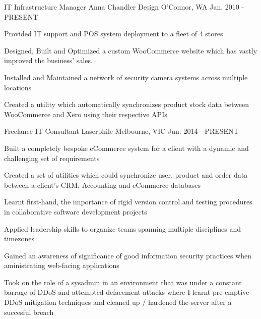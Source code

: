 

\begin{cventries}

  \cventry
    {IT Infrastructure Manager} %
    {Anna Chandler Design} %
    {O'Connor, WA} %
    {Jan. 2010 - PRESENT} %
    {
      \begin{cvitems} %
        \item {Provided IT support and POS system deployment to a fleet of 4 stores}
        \item {Designed, Built and Optimized a custom WooCommerce website which has vastly improved the business’ sales.}
        \item {Installed and Maintained a network of security camera systems across multiple locations}
        \item {Created a utility which automatically synchronizes product stock data between WooCommerce and Xero using their respective APIs}
      \end{cvitems}
    }

  \cventry
    {Freelance IT Consultant} %
    {Laserphile} %
    {Melbourne, VIC} %
    {Jun. 2014 - PRESENT} %
    {
      \begin{cvitems} %
        \item {Built a completely bespoke eCommerce system for a client with a dynamic and challenging set of requirements}
        \item {Created a set of utilities which could synchronize user, product and order data between a client's CRM, Accounting and eCommerce databases}
        \item {Learnt first-hand, the importance of rigid version control and testing procedures in collaborative software development projects}
        \item {Applied leadership skills to organize teams spanning multiple disciplines and timezones}
        \item {Gained an awareness of significance of good information security practices when aministrating web-facing applications}
        \item {Took on the role of a sysadmin in an environment that was under a constant barrage of DDoS and attempted defacement attacks where I learnt pre-emptive DDoS mitigation techniques and cleaned up / hardened the server after a succesful breach}
      \end{cvitems}
    }

\end{cventries}
